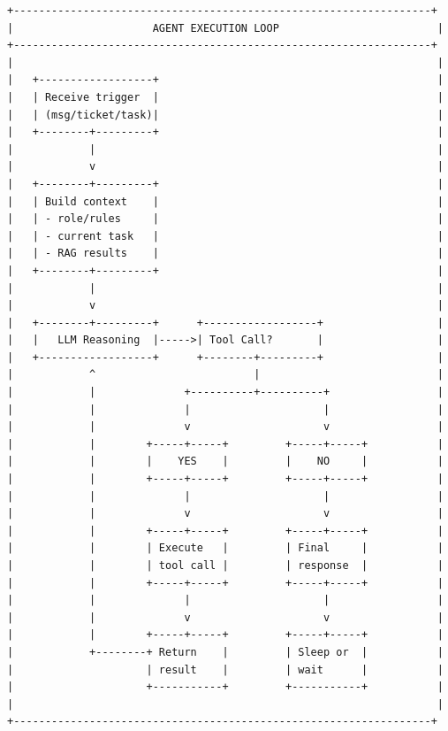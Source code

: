 \documentclass[11pt,a4paper]{article}
\begin{document}
\begin{verbatim}
+------------------------------------------------------------------+
|                      AGENT EXECUTION LOOP                         |
+------------------------------------------------------------------+
|                                                                   |
|   +------------------+                                            |
|   | Receive trigger  |                                            |
|   | (msg/ticket/task)|                                            |
|   +--------+---------+                                            |
|            |                                                      |
|            v                                                      |
|   +--------+---------+                                            |
|   | Build context    |                                            |
|   | - role/rules     |                                            |
|   | - current task   |                                            |
|   | - RAG results    |                                            |
|   +--------+---------+                                            |
|            |                                                      |
|            v                                                      |
|   +--------+---------+      +------------------+                  |
|   |   LLM Reasoning  |----->| Tool Call?       |                  |
|   +------------------+      +--------+---------+                  |
|            ^                         |                            |
|            |              +----------+----------+                 |
|            |              |                     |                 |
|            |              v                     v                 |
|            |        +-----+-----+         +-----+-----+           |
|            |        |    YES    |         |    NO     |           |
|            |        +-----+-----+         +-----+-----+           |
|            |              |                     |                 |
|            |              v                     v                 |
|            |        +-----+-----+         +-----+-----+           |
|            |        | Execute   |         | Final     |           |
|            |        | tool call |         | response  |           |
|            |        +-----+-----+         +-----+-----+           |
|            |              |                     |                 |
|            |              v                     v                 |
|            |        +-----+-----+         +-----+-----+           |
|            +--------+ Return    |         | Sleep or  |           |
|                     | result    |         | wait      |           |
|                     +-----------+         +-----------+           |
|                                                                   |
+------------------------------------------------------------------+
\end{verbatim}
\end{document}
